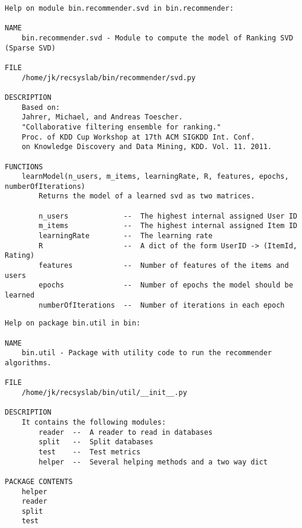 \begin{lstlisting}
Help on module bin.recommender.svd in bin.recommender:

NAME
    bin.recommender.svd - Module to compute the model of Ranking SVD (Sparse SVD)

FILE
    /home/jk/recsyslab/bin/recommender/svd.py

DESCRIPTION
    Based on:
    Jahrer, Michael, and Andreas Toescher.
    "Collaborative filtering ensemble for ranking."
    Proc. of KDD Cup Workshop at 17th ACM SIGKDD Int. Conf.
    on Knowledge Discovery and Data Mining, KDD. Vol. 11. 2011.

FUNCTIONS
    learnModel(n_users, m_items, learningRate, R, features, epochs, numberOfIterations)
        Returns the model of a learned svd as two matrices.
        
        n_users             --  The highest internal assigned User ID
        m_items             --  The highest internal assigned Item ID
        learningRate        --  The learning rate
        R                   --  A dict of the form UserID -> (ItemId, Rating)
        features            --  Number of features of the items and users
        epochs              --  Number of epochs the model should be learned
        numberOfIterations  --  Number of iterations in each epoch
\end{lstlisting}

\begin{lstlisting}
Help on package bin.util in bin:

NAME
    bin.util - Package with utility code to run the recommender algorithms.

FILE
    /home/jk/recsyslab/bin/util/__init__.py

DESCRIPTION
    It contains the following modules:
        reader  --  A reader to read in databases
        split   --  Split databases
        test    --  Test metrics
        helper  --  Several helping methods and a two way dict

PACKAGE CONTENTS
    helper
    reader
    split
    test
\end{lstlisting}

